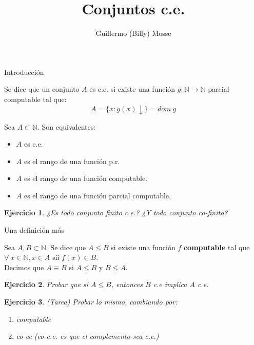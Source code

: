 \documentclass[11pt]{beamer}
\author{Guillermo (Billy) Mosse}
\title{Conjuntos c.e.}
\institute{FCEyN, UBA}
\date
\def\key#1{\{#1\}}
\def\N{\mathbb{N}}
\newtheorem{exercise}{Ejercicio}
\begin{document}


\begin{frame}
\titlepage
\end{frame}


\begin{frame}{Introducción}
\begin{definition}
Se dice que un conjunto $A$ es c.e. si existe una función $g :\N \to \N$ parcial computable tal que:
$$A = \key{x: g(x) \downarrow } = dom\ g$$
\end{definition} \pause

\begin{theorem}
Sea $A \subset \N$. Son equivalentes:
\begin{itemize}
	\item $A$ es c.e.
	\item $A$ es el rango de una función p.r.
	\item $A$ es el rango de una función computable.
	\item $A$ es el rango de una función parcial computable.
\end{itemize}
\end{theorem} \pause

\begin{exercise}
	¿Es todo conjunto finito c.e.? ¿Y todo conjunto co-finito?
\end{exercise}

\end{frame}

\begin{frame}{Una definición más}
	\begin{definition}
		Sea $A,B \subset \N$. Se dice que $A \leq B$ si existe una función $f$ \textbf{computable} tal que $\forall\ x \in \N, x \in A$ sii $f(x) \in B$. \\
		
		Decimos que $A \equiv B$ si $A\leq B$ y $B \leq A$.
	\end{definition} \pause
	
	\begin{exercise}	
	Probar que si $A \leq B$, entonces $B$ c.e implica $A$ c.e.
	\end{exercise} \pause

	\begin{exercise}{(Tarea)}
	Probar lo mismo, cambiando  por:
	\begin{enumerate}
		\item computable
		\item co-ce	(co-c.e. es que el complemento sea c.e.)
	\end{enumerate}
	\end{exercise}	
\end{frame}
\end{document}
